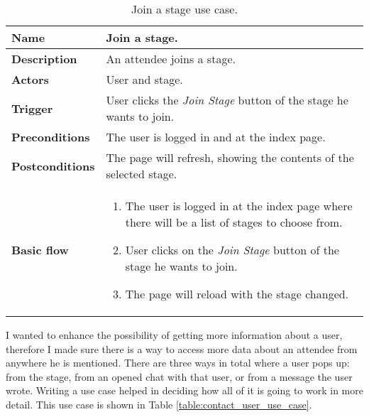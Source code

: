 \begin{table}
	\centering

	\begin{tabular}{ | p{3.2cm} | p{11cm} | }
		\hline
		\textbf{Name} & Join a stage. \\
		\hline
		\textbf{Description} & An attendee joins a stage. \\
		\hline
		\textbf{Actors} & User and stage. \\
		\hline
		\textbf{Trigger} & User clicks the \textit{Join Stage} button of the stage he wants to join.  \\
		\hline
		\textbf{Preconditions} & The user is logged in and at the index page. \\
		\hline
		\textbf{Postconditions} & The page will refresh, showing the contents of the selected stage. \\
		\hline
		\textbf{Basic flow} & \begin{enumerate}[topsep=1em,parsep=-.5em]
			\item The user is logged in at the index page where there will be a list of stages to choose from.
			\item User clicks on the \textit{Join Stage} button of the stage he wants to join.
			\item The page will reload with the stage changed.
		\end{enumerate}} \\
		\hline
	\end{tabular}	

	\caption{Join a stage use case.}
	\label{table:join_stage_use_case}
\end{table}

I wanted to enhance the possibility of getting more information about a user, therefore I made sure there is a way to access more data about an attendee from anywhere he is mentioned. There are three ways in total where a user pops up: from the stage, from an opened chat with that user, or from a message the user wrote. Writing a use case helped in deciding how all of it is going to work in more detail. This use case is shown in Table \ref{table:contact_user_use_case}.

